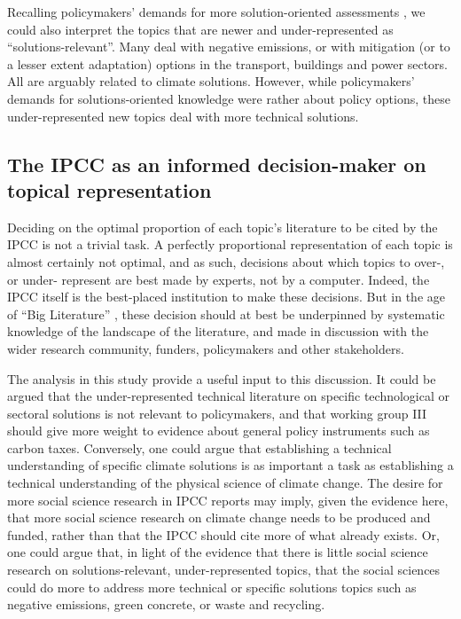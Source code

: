 \documentclass{article}
\begin{document}
\begin{linenumbers}
Recalling policymakers' demands for more solution-oriented assessments \cite{Kowarsch2017}, we could also interpret the topics that are newer and under-represented as ``solutions-relevant''. Many deal with negative emissions, or with mitigation (or to a lesser extent adaptation) options in the transport, buildings and power sectors. All are arguably related to climate solutions. However, while policymakers' demands for solutions-oriented knowledge were rather about policy options, these under-represented new topics deal with more technical solutions.

\subsection*{The IPCC as an informed decision-maker on topical representation}

Deciding on the optimal proportion of each topic's literature to be cited by the IPCC is not a trivial task. A perfectly proportional representation of each topic is almost certainly not optimal, and as such, decisions about which topics to over-, or under- represent are best made by experts, not by a computer. Indeed, the IPCC itself is the best-placed institution to make these decisions. But in the age of ``Big Literature'' \cite{Nunez-Mir2016}, these decision should at best be underpinned by systematic knowledge of the landscape of the literature, and made in discussion with the wider research community, funders, policymakers and other stakeholders.

The analysis in this study provide a useful input to this discussion. It could be argued that the under-represented technical literature on specific technological or sectoral solutions is not relevant to policymakers, and that working group III should give more weight to evidence about general policy instruments such as carbon taxes. Conversely, one could argue that establishing a technical understanding of specific climate solutions is as important a task as establishing a technical understanding of the physical science of climate change. The desire for more social science research in IPCC reports may imply, given the evidence here, that more social science research on climate change needs to be produced and funded, rather than that the IPCC should cite more of what already exists. Or, one could argue that, in light of the evidence that there is little social science research on solutions-relevant, under-represented topics, that the social sciences could do more to address more technical or specific solutions topics such as negative emissions, green concrete, or waste and recycling.


\end{linenumbers}
\end{document}
